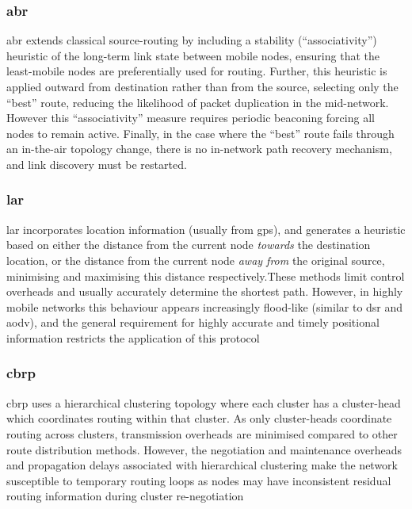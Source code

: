 \subsubsection{\gls{abr}}
\gls{abr} extends classical source-routing by including a stability (``associativity'') heuristic of the long-term link state between mobile nodes, ensuring that the least-mobile nodes are preferentially used for routing. Further, this heuristic is applied outward from destination rather than from the source, selecting only the ``best'' route, reducing the likelihood of packet duplication in the mid-network. However this ``associativity'' measure requires periodic beaconing forcing all nodes to remain active. Finally, in the case where the ``best'' route fails through an in-the-air topology change, there is no in-network path recovery mechanism, and link discovery must be restarted\cite{Toh1997}.\\
\subsubsection{\gls{lar}}
\gls{lar} incorporates location information (usually from \gls{gps}), and generates a heuristic based on either the distance from the current node \emph{towards} the destination location, or the distance from the current node \emph{away from} the original source, minimising and maximising this distance respectively.These methods limit control overheads and usually accurately determine the shortest path. However, in highly mobile networks this behaviour appears increasingly flood-like (similar to \gls{dsr} and \gls{aodv}), and the general requirement for highly accurate and timely positional information restricts the application of this protocol\\
\subsubsection{\gls{cbrp}}
\gls{cbrp} uses a hierarchical clustering topology where each cluster has a cluster-head which coordinates routing within that cluster. As only cluster-heads coordinate routing across clusters, transmission overheads are minimised compared to other route distribution methods. However, the negotiation and maintenance overheads and propagation delays associated with hierarchical clustering make the network susceptible to temporary routing loops as nodes may have inconsistent residual routing information during cluster re-negotiation\\
